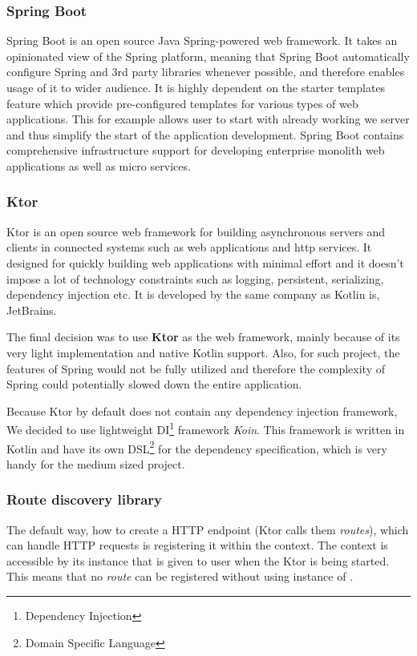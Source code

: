 \subsubsection{Spring Boot}
Spring Boot\cite{springBootReference} is an open source Java Spring-powered web framework.
It takes an opinionated view of the Spring platform,
meaning that Spring Boot automatically configure Spring and 3rd party libraries whenever possible,
and therefore enables usage of it to wider audience.
It is highly dependent on the starter templates feature which provide pre-configured templates for various types of web applications.
This for example allows user to start with already working we server
and thus simplify the start of the application development\cite{springBootGithubReference}.
Spring Boot contains comprehensive infrastructure support for developing enterprise monolith web applications as well as micro services\cite{springBootGithubReference}.

\subsubsection{Ktor}\label{subsubsec:ktor}
Ktor\cite{ktorWebPage} is an open source web framework for building asynchronous servers 
and clients in connected systems such as web applications and http services.
It designed for quickly building web applications with minimal effort 
and it doesn't impose a lot of technology constraints such as logging, persistent, serializing, dependency injection etc.\cite{ktorApiReference}
It is developed by the same company as Kotlin is, JetBrains.


\bigskip
The final decision was to use \textbf{Ktor} as the web framework,
mainly because of its very light implementation and native Kotlin support.
Also, for such project, 
the features of Spring would not be fully utilized
and therefore the complexity of Spring could potentially slowed down the entire application.

Because Ktor by default does not contain any dependency injection framework, 
We decided to use lightweight DI\footnote{Dependency Injection} framework \textit{Koin}\cite{koinGithub}.
This framework is written in Kotlin and have its own DSL\footnote{Domain Specific Language} for the dependency specification,
which is very handy for the medium sized project.

\subsubsection{Route discovery library}
The default way, how to create a HTTP endpoint (Ktor calls them \textit{routes}),
which can handle HTTP requests is registering it within the  context.
The  context is accessible by its instance that is given to user when the Ktor is being started.
This means that no \textit{route} can be registered without using instance of .

